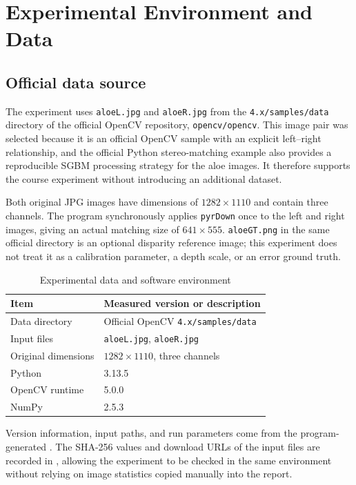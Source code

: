 \section{Experimental Environment and Data}

\subsection{Official data source}

The experiment uses \texttt{aloeL.jpg} and \texttt{aloeR.jpg} from the \texttt{4.x/samples/data} directory of the official OpenCV repository, \texttt{opencv/opencv}. This image pair was selected because it is an official OpenCV sample with an explicit left--right relationship, and the official Python stereo-matching example also provides a reproducible SGBM processing strategy for the aloe images. It therefore supports the course experiment without introducing an additional dataset.

Both original JPG images have dimensions of $1282\times1110$ and contain three channels. The program synchronously applies \texttt{pyrDown} once to the left and right images, giving an actual matching size of $641\times555$. \texttt{aloeGT.png} in the same official directory is an optional disparity reference image; this experiment does not treat it as a calibration parameter, a depth scale, or an error ground truth.

\begin{table}[H]
  \centering
  \caption{Experimental data and software environment}
  \label{tab:environment}
  \begin{tabular}{ll}
    \toprule
    Item & Measured version or description \\
    \midrule
    Data directory & Official OpenCV \texttt{4.x/samples/data} \\
    Input files & \texttt{aloeL.jpg}, \texttt{aloeR.jpg} \\
    Original dimensions & $1282\times1110$, three channels \\
    Python & 3.13.5 \\
    OpenCV runtime & 5.0.0 \\
    NumPy & 2.5.3 \\
    \bottomrule
  \end{tabular}
\end{table}

Version information, input paths, and run parameters come from the program-generated . The SHA-256 values and download URLs of the input files are recorded in , allowing the experiment to be checked in the same environment without relying on image statistics copied manually into the report.

